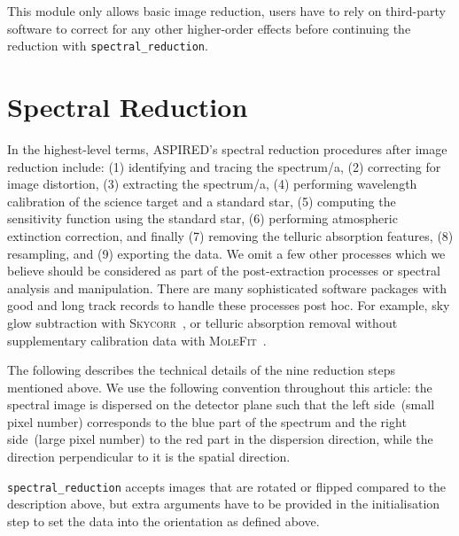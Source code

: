 \documentclass[linenumbers, twocolumn]{aastex631}
\begin{document}
This module only allows basic image reduction, users have to rely on third-party
software to correct for any other higher-order effects before continuing the
reduction with \texttt{spectral\_reduction}.

\section{Spectral Reduction}
\label{sec:spectral_reduction}

In the highest-level terms, \textsc{ASPIRED}'s spectral reduction procedures
after image reduction include: (1) identifying and tracing the spectrum/a,
(2) correcting for image distortion, (3) extracting the spectrum/a,
(4) performing wavelength calibration of the science target and a standard
star, (5) computing the sensitivity function using the standard star,
(6) performing atmospheric extinction correction, and finally (7) removing
the telluric absorption features, (8) resampling, and (9) exporting the data.
We omit a few other processes which we believe should be considered as part of
the post-extraction processes or spectral analysis and manipulation. There are
many sophisticated  software packages with good and long track records to
handle these processes post hoc. For example, sky glow subtraction with
\textsc{Skycorr}~\citep{2014A&A...567A..25N}, or telluric
absorption removal without supplementary calibration data with
\textsc{MoleFit}~\citep{2015A&A...576A..77S, 2015A&A...576A..78K}.

The following describes the technical details of the nine reduction steps mentioned above.
We use the following convention throughout this article: the spectral image is
dispersed on the detector plane such that the left side~(small pixel number)
corresponds to the blue part of the spectrum and the right side~(large pixel
number) to the red part in the dispersion direction, while the direction
perpendicular to it is the spatial direction.

\texttt{spectral\_reduction} accepts images that are rotated or flipped
compared to the description above, but extra arguments have to be provided
in the initialisation step to set the data into the orientation as defined
above.

\end{document}
